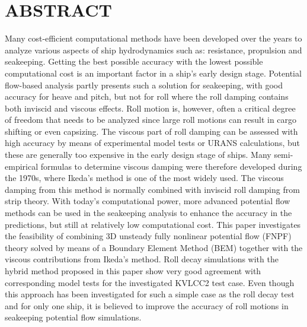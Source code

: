 \section*{ABSTRACT}\label{abstract}

Many cost-efficient computational methods have been developed over the
years to analyze various aspects of ship hydrodynamics such as:
resistance, propulsion and seakeeping. Getting the best possible
accuracy with the lowest possible computational cost is an important
factor in a ship's early design stage. Potential flow-based analysis
partly presents such a solution for seakeeping, with good accuracy for
heave and pitch, but not for roll where the roll damping contains both
inviscid and viscous effects. Roll motion is, however, often a critical
degree of freedom that needs to be analyzed since large roll motions can
result in cargo shifting or even capsizing. The viscous part of roll
damping can be assessed with high accuracy by means of experimental
model tests or URANS calculations, but these are generally too expensive
in the early design stage of ships. Many semi-empirical formulas to
determine viscous damping were therefore developed during the 1970s,
where Ikeda's method is one of the most widely used. The viscous damping
from this method is normally combined with inviscid roll damping from
strip theory. With today's computational power, more advanced potential
flow methods can be used in the seakeeping analysis to enhance the
accuracy in the predictions, but still at relatively low computational
cost. This paper investigates the feasibility of combining 3D unsteady
fully nonlinear potential flow (FNPF) theory solved by means of a
Boundary Element Method (BEM) together with the viscous contributions
from Ikeda's method. Roll decay simulations with the hybrid method
proposed in this paper show very good agreement with corresponding model
tests for the investigated KVLCC2 test case. Even though this approach
has been investigated for such a simple case as the roll decay test and
for only one ship, it is believed to improve the accuracy of roll
motions in seakeeping potential flow simulations.

    